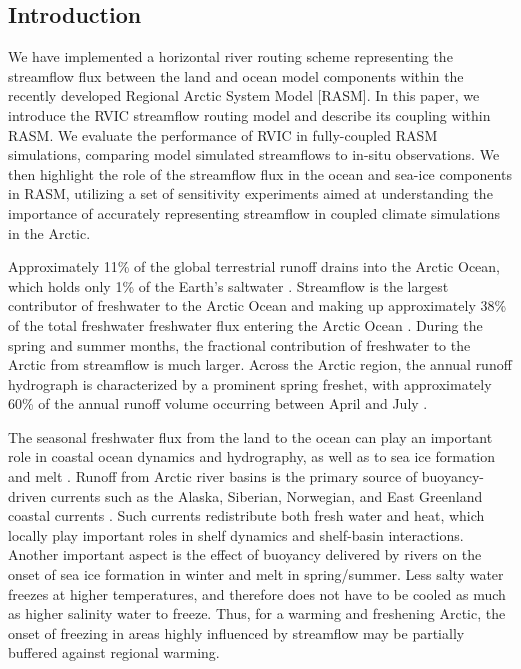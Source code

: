 \documentclass[jgrga, draft]{agutex}
\begin{document}
%

\begin{article}

%
%

\section{Introduction}

We have implemented a horizontal river routing scheme representing the streamflow flux between the land and ocean model components within the recently developed Regional Arctic System Model [RASM].
In this paper, we introduce the RVIC streamflow routing model and describe its coupling within RASM.
We evaluate the performance of RVIC in fully-coupled RASM simulations, comparing model simulated streamflows to in-situ observations.
We then highlight the role of the streamflow flux in the ocean and sea-ice components in RASM, utilizing a set of sensitivity experiments aimed at understanding the importance of accurately representing streamflow in coupled climate simulations in the Arctic.

Approximately 11\% of the global terrestrial runoff drains into the Arctic Ocean, which holds only 1\% of the Earth's saltwater \citep{Lewis_2000,Lammers_2001}.
Streamflow is the largest contributor of freshwater to the Arctic Ocean and making up approximately 38\% of the total freshwater freshwater flux entering the Arctic Ocean \citep{Serreze_2006}.
During the spring and summer months, the fractional contribution of freshwater to the Arctic from streamflow is much larger.
Across the Arctic region, the annual runoff hydrograph is characterized by a prominent spring freshet, with approximately 60\% of the annual runoff volume occurring between April and July \citep{Lammers_2001}.

The seasonal freshwater flux from the land to the ocean can play an important role in coastal ocean dynamics and hydrography, as well as to sea ice formation and melt \citep{Rabe_2011,Fichot_2013}.
Runoff from Arctic river basins is the primary source of buoyancy-driven currents such as the Alaska, Siberian, Norwegian, and East Greenland coastal currents \citep[e.g.][]{Morison_2000,Boyd_2002,McGeehan_2012}.
Such currents redistribute both fresh water and heat, which locally play important roles in shelf dynamics and shelf-basin interactions.
Another important aspect is the effect of buoyancy delivered by rivers on the onset of sea ice formation in winter and melt in spring/summer.
Less salty water freezes at higher temperatures, and therefore does not have to be cooled as much as higher salinity water to freeze.
Thus, for a warming and freshening Arctic, the onset of freezing in areas highly influenced by streamflow may be partially buffered against regional warming.


\end{article}
\end{document}
